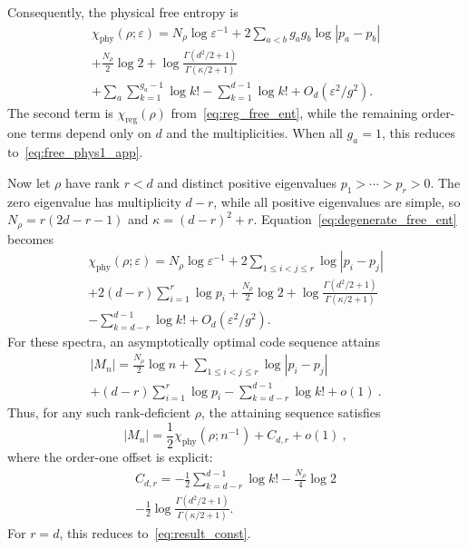 \documentclass[aps,prl,twocolumn,superscriptaddress,amsmath,amssymb,reprint,longbibliography]{revtex4-2}
\def\eps{\varepsilon}
\begin{document}
Consequently, the physical free entropy is
\begin{multline}\label{eq:degenerate_free_ent}
    \chi_\mathrm{phy}(\rho;\eps)
    =N_\rho\log \eps^{-1}
    +2\sum_{a<b}g_a g_b\log|p_a-p_b|\\
    +\frac{N_\rho}{2}\log2
    +\log\frac{\Gamma(d^2/2+1)}{\Gamma(\kappa/2+1)}\\
    +\sum_a\sum_{k=1}^{g_a-1}\log k!
    -\sum_{k=1}^{d-1}\log k!
    +O_d(\eps^2/g^2).
\end{multline}
The second term is $\chi_\mathrm{reg}(\rho)$ from~\eqref{eq:reg_free_ent}, while the remaining order-one terms depend only on $d$ and the multiplicities. When all $g_a=1$, this reduces to~\eqref{eq:free_phys1_app}.

Now let $\rho$ have rank $r<d$ and distinct positive eigenvalues $p_1>\cdots>p_r>0$. The zero eigenvalue has multiplicity $d-r$, while all positive eigenvalues are simple, so $N_\rho=r(2d-r-1)$ and $\kappa=(d-r)^2+r$. Equation~\eqref{eq:degenerate_free_ent} becomes
\begin{multline}
    \chi_\mathrm{phy}(\rho;\eps)
    = N_\rho\log \eps^{-1} +2\sum_{1\le i<j\le r}\log |p_i-p_j|
    \\+2(d-r)\sum_{i=1}^{r}\log p_i
    +\frac{N_\rho}2\log2
    +\log\frac{\Gamma(d^2/2+1)}
    {\Gamma(\kappa/2+1)}\\
    -\sum_{k=d-r}^{d-1}\log k!
    +O_d(\eps^2/g^2).
\end{multline}
For these spectra, an asymptotically optimal code sequence attains~\cite{paper2}
\begin{multline}\label{eq:rank_def_qmdl}
    |M_n|
    =\frac{N_\rho}2\log n
    +\sum_{1\le i<j\le r}\log|p_i-p_j|\\
    +(d-r)\sum_{i=1}^r\log p_i
    -\sum_{k=d-r}^{d-1}\log k!+o(1)\ .
\end{multline}
Thus, for any such rank-deficient $\rho$, the attaining sequence satisfies
\begin{equation}
    |M_n| = \frac{1}{2}\chi_\mathrm{phy}(\rho;n^{-1})
    + C_{d,r} + o(1)\ ,
\end{equation}
where the order-one offset is explicit:
\begin{multline}
    C_{d,r}
    =-\frac12\sum_{k=d-r}^{d-1}\log k!
    -\frac{N_\rho}4\log2\\
    -\frac12\log
    \frac{\Gamma(d^2/2+1)}{\Gamma(\kappa/2+1)}.
\end{multline}
For $r=d$, this reduces to~\eqref{eq:result_const}.
\end{document}
